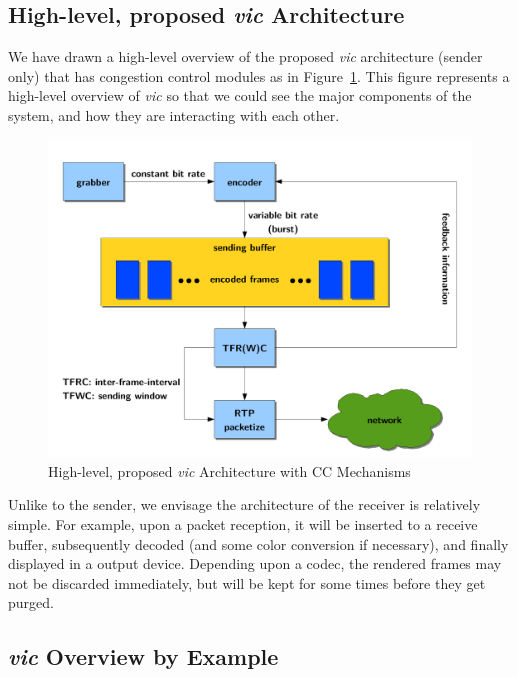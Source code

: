 
\subsection{\label{ssec:high-arch}High-level, proposed \emph{vic} Architecture}

We have drawn a high-level overview of the proposed \emph{vic} architecture
(sender only) that has congestion control modules as in
Figure~\ref{fig:high-vic-arch}.  This figure represents a high-level overview of
\emph{vic} so that we could see the major components of the system, and how they
are interacting with each other. 

\vspace{1cm}

\begin{figure}[!h]
\begin{center}
\includegraphics[scale=.5]{./img/high-vic-arch}
\caption{\label{fig:high-vic-arch}High-level, proposed \emph{vic} Architecture 
with CC Mechanisms}
\end{center}
\end{figure}

Unlike to the sender, we envisage the architecture of the receiver is relatively
simple. For example, upon a packet reception, it will be inserted to a receive
buffer, subsequently decoded (and some color conversion if necessary), and
finally displayed in a output device. Depending upon a codec, the rendered
frames may not be discarded immediately, but will be kept for some times before
they get purged.

\subsection{\label{ssec:vic-overview}\emph{vic} Overview by Example}

